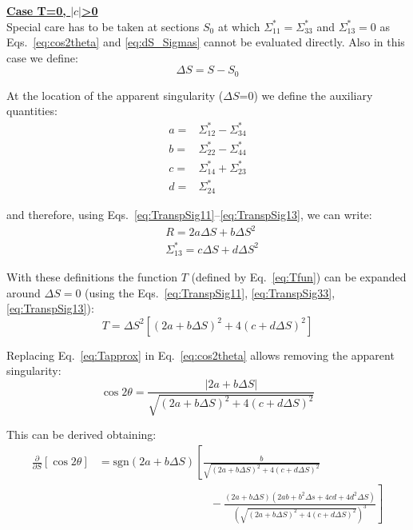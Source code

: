  
 
\textbf{\underline{Case T=0, $\left| c \right|$>0}}
~\\

Special care has to be taken at sections $S_0$ at which ${\Sigma}^*_{11}={\Sigma}^*_{33}$ and ${\Sigma}^*_{13}=0$ as Eqs.~\ref{eq:cos2theta}  and \ref{eq:dS_Sigmas} cannot be evaluated directly. Also in this case we define:
\begin{equation}
\Delta S = S - S_0
\end{equation}

At the location of the apparent singularity ($\Delta S$=0) we define the auxiliary quantities:
\begin{align}
a =& \Sigma^*_{12} - \Sigma^*_{34}\\
b =& \Sigma^*_{22} - \Sigma^*_{44}\\
c =& \Sigma^*_{14} + \Sigma^*_{23}\\
d =& \Sigma^*_{24} 
\end{align}

and therefore, using Eqs.~\ref{eq:TranspSig11}--\ref{eq:TranspSig13}, we can write:
\begin{align}
&R = 2a \Delta S + b \Delta S^2 \label{eq:specR}\\
&\Sigma^*_{13} =c \Delta S +d \Delta S^2\label{eq:specS13}
\end{align}

With these definitions the function $T$ (defined by Eq.~\ref{eq:Tfun}) can be expanded around $\Delta S =0$ (using the Eqs.~\ref{eq:TranspSig11}, \ref{eq:TranspSig33}, \ref{eq:TranspSig13}):
\begin{equation}
T = \Delta S^2\left[\left(2a +b \Delta S \right)^2 +4\left( c +d \Delta S\right)^2\right]
\label{eq:Tapprox}
\end{equation}

Replacing Eq.~\ref{eq:Tapprox} in Eq.~\ref{eq:cos2theta} allows  removing the apparent singularity:
\begin{equation}
\cos 2 \theta = \frac{\left| 2a+b \Delta S\right|}{\sqrt{\left(2a +b \Delta S \right)^2 +4\left( c +d \Delta S\right)^2}}
\label{eq:cost_spc}
\end{equation}

This can be derived obtaining:
\begin{align}
\frac{\partial }{\partial S} \left[ \cos 2\theta \right] &= \mathrm{sgn}(2a+b \Delta S)\left[
\frac{b}{\sqrt{\left(2a +b \Delta S \right)^2 +4\left( c +d \Delta S\right)^2}}
\right. \nonumber \\  &\left. \qquad \qquad \qquad \qquad \qquad
-\frac{(2a+b\Delta S)(2ab+b^2 \Delta s +4 c d+ 4 d^2 \Delta S)}{\left(\sqrt{\left(2a +b \Delta S \right)^2 +4\left( c +d \Delta S\right)^2}\right)^3}
\right]
\end{align}

